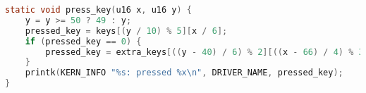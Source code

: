 \begin{lstlisting}[language=c,caption=Функция перевода координат в клавишу,label=lst:press_key]
static void press_key(u16 x, u16 y) {
    y = y >= 50 ? 49 : y;
    pressed_key = keys[(y / 10) % 5][x / 6];
    if (pressed_key == 0) {
        pressed_key = extra_keys[((y - 40) / 6) % 2][((x - 66) / 4) % 3];
    }
    printk(KERN_INFO "%s: pressed %x\n", DRIVER_NAME, pressed_key);
}
\end{lstlisting}
